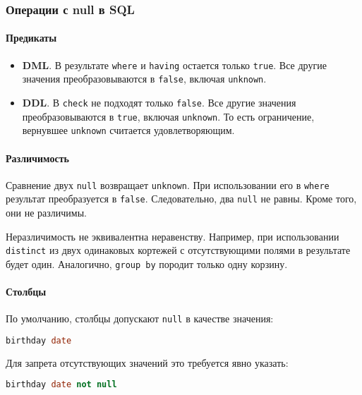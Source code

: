 \subsubsection{Операции с null в SQL}

\paragraph{Предикаты}

\begin{itemize}
	\item \textbf{DML}. В результате \texttt{where} и \texttt{having} остается только
	      \texttt{true}. Все другие значения преобразовываются в \texttt{false}, включая
	      \texttt{unknown}.
	\item \textbf{DDL}. В \texttt{check} не подходят только \texttt{false}. Все другие
	      значения
	      преобразовываются в \texttt{true}, включая \texttt{unknown}. То есть ограничение,
	      вернувшее \texttt{unknown} считается удовлетворяющим.
\end{itemize}

\paragraph{Различимость}

Сравнение двух \texttt{null} возвращает \texttt{unknown}. При использовании его в
\texttt{where} результат преобразуется в \texttt{false}. Следовательно, два
\texttt{null} не равны. Кроме того, они не различимы.

Неразличимость не эквивалентна неравенству. Например, при использовании \texttt{distinct} из
двух одинаковых кортежей с отсутствующими полями в результате будет один. Аналогично,
\texttt{group by} породит только одну корзину.

\paragraph{Столбцы}

По умолчанию, столбцы допускают \texttt{null} в качестве значения:

\begin{lstlisting}[language=SQL]
    birthday date
\end{lstlisting}

Для запрета отсутствующих значений это требуется явно указать:

\begin{lstlisting}[language=SQL]
    birthday date not null
\end{lstlisting}

